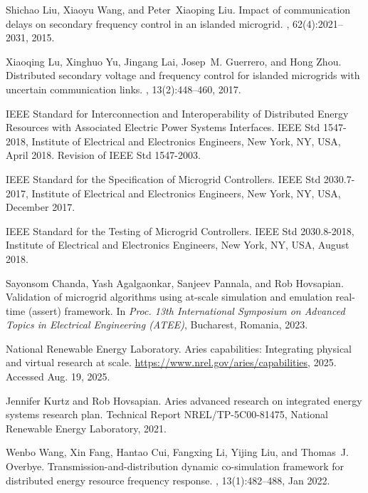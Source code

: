 \documentclass[12pt]{article}
\begin{document}
\begin{thebibliography}{10}
Shichao Liu, Xiaoyu Wang, and Peter~Xiaoping Liu.
\newblock Impact of communication delays on secondary frequency control in an
  islanded microgrid.
, 62(4):2021--2031,
  2015.

Xiaoqing Lu, Xinghuo Yu, Jingang Lai, Josep~M. Guerrero, and Hong Zhou.
\newblock Distributed secondary voltage and frequency control for islanded
  microgrids with uncertain communication links.
, 13(2):448--460,
  2017.

{IEEE Standard for Interconnection and Interoperability of Distributed Energy
  Resources with Associated Electric Power Systems Interfaces}.
\newblock IEEE Std 1547-2018, Institute of Electrical and Electronics
  Engineers, New York, NY, USA, April 2018.
\newblock Revision of IEEE Std 1547-2003.

{IEEE Standard for the Specification of Microgrid Controllers}.
\newblock IEEE Std 2030.7-2017, Institute of Electrical and Electronics
  Engineers, New York, NY, USA, December 2017.

{IEEE Standard for the Testing of Microgrid Controllers}.
\newblock IEEE Std 2030.8-2018, Institute of Electrical and Electronics
  Engineers, New York, NY, USA, August 2018.

Sayonsom Chanda, Yash Agalgaonkar, Sanjeev Pannala, and Rob Hovsapian.
\newblock Validation of microgrid algorithms using at-scale simulation and
  emulation real-time (assert) framework.
\newblock In {\em Proc. 13th International Symposium on Advanced Topics in
  Electrical Engineering (ATEE)}, Bucharest, Romania, 2023.

{National Renewable Energy Laboratory}.
\newblock Aries capabilities: Integrating physical and virtual research at
  scale.
\newblock \url{https://www.nrel.gov/aries/capabilities}, 2025.
\newblock Accessed Aug. 19, 2025.

Jennifer Kurtz and Rob Hovsapian.
\newblock Aries advanced research on integrated energy systems research plan.
\newblock Technical Report NREL/TP-5C00-81475, National Renewable Energy
  Laboratory, 2021.

Wenbo Wang, Xin Fang, Hantao Cui, Fangxing Li, Yijing Liu, and Thomas~J.
  Overbye.
\newblock Transmission-and-distribution dynamic co-simulation framework for
  distributed energy resource frequency response.
, 13(1):482--488, Jan 2022.


\end{thebibliography}
\end{document}
